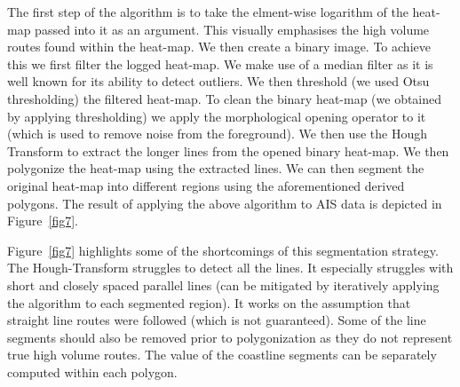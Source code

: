 \documentclass{article}
\begin{document}
The first step of the algorithm is to take the elment-wise logarithm of the heat-map passed into it as an argument. This visually emphasises the high volume routes found within the heat-map. We then 
create a binary image. To achieve this we first filter the logged heat-map. We make use of a median filter as it is well known for its ability to detect outliers. We then threshold (we used Otsu thresholding) the  
filtered heat-map. To clean the binary heat-map (we obtained by applying thresholding) we apply the morphological opening operator to it (which is used to remove noise from the foreground).
We then use the Hough Transform to extract the longer lines from the opened binary heat-map. We then polygonize the heat-map using the extracted lines. We can then 
segment the original heat-map into different regions using the aforementioned derived polygons. The result of applying the above algorithm to AIS data is depicted in Figure~\ref{fig7}.


Figure~\ref{fig7} highlights some of the shortcomings of this segmentation strategy. The Hough-Transform struggles to detect all 
the lines. It especially struggles with short and closely spaced parallel lines (can be mitigated by iteratively applying the algorithm to each segmented region). It works on the assumption that straight line routes were followed (which is not guaranteed). Some of the line segments should also be removed prior to polygonization as they do not 
represent true high volume routes. The value of the coastline segments can be separately computed within each polygon.
 
\end{document}
